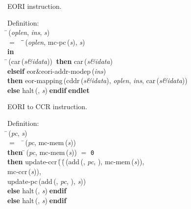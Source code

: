  EORI instruction.
\begin{tabbing}{\sc Definition}: \\  
\=\,({\it{oplen\/}}, {\it{ins\/}}, {\it{s\/}}) \\ 
$=$$\;\;\;\;$\=\=\,({\it{oplen\/}}, {\rm{mc-pc}}\,({\it{s\/}}), {\it{s\/}})\- \\ 
{\bf in} \\ 
\=\,({\rm{car}}\,({\it{s\&idata\/}}))$\;\;${\bf then }{\rm{car}}\,({\it{s\&idata\/}}) \\ 
{\bf elseif }{\rm{eor\&eori-addr-modep}}\,({\it{ins\/}}) \\ 
{\bf then }{\rm{eor-mapping}}\,({\rm{cddr}}\,({\it{s\&idata\/}}), {\it{oplen\/}}, {\it{ins\/}}, {\rm{car}}\,({\it{s\&idata\/}})) \\ 
{\bf else }{\rm{halt}}\,({}, {\it{s\/}})$\;${\bf  endif}\-$\;${\bf  endlet}\-\-
\end{tabbing}

 EORI to CCR instruction.
\begin{tabbing}{\sc Definition}: \\  
\=\,({\it{pc\/}}, {\it{s\/}}) \\ 
$=$$\;\;\;\;$\=\,({\it{pc\/}}, {\rm{mc-mem}}\,({\it{s\/}})) \\ 
{\bf then }\=\,({\it{pc\/}}, {\rm{mc-mem}}\,({\it{s\/}})) $=$ {\tt{0}} \\ 
{\bf then }{\rm{update-ccr}}\,(\=\,(\=\,({\rm{add}}\,({}, {\it{pc\/}}, {}), {\rm{mc-mem}}\,({\it{s\/}})), \\ 
{\rm{mc-ccr}}\,({\it{s\/}}))\-, \\ 
{\rm{update-pc}}\,({\rm{add}}\,({}, {\it{pc\/}}, {}), {\it{s\/}}))\- \\ 
{\bf else }{\rm{halt}}\,({}, {\it{s\/}})$\;${\bf  endif}\- \\ 
{\bf else }{\rm{halt}}\,({}, {\it{s\/}})$\;${\bf  endif}\-\-
\end{tabbing}

